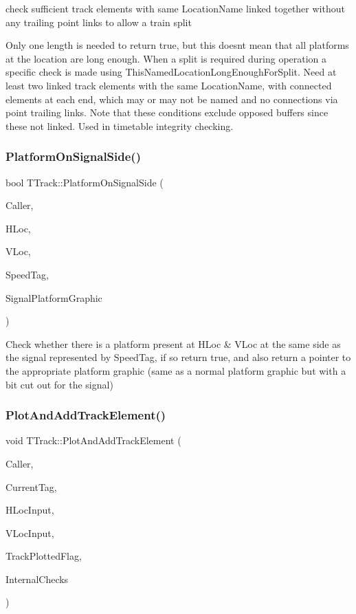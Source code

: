 check sufficient track elements with same Location\+Name linked together without any trailing point links to allow a train split

Only one length is needed to return true, but this doesn\textquotesingle{}t mean that all platforms at the location are long enough. When a split is required during operation a specific check is made using This\+Named\+Location\+Long\+Enough\+For\+Split. Need at least two linked track elements with the same Location\+Name, with connected elements at each end, which may or may not be named and no connections via point trailing links. Note that these conditions exclude opposed buffers since these not linked. Used in timetable integrity checking. \mbox{\label{class_t_track_a7c2888cb7acea2b9c65c5f9cc538df66}} 
\subsubsection{\texorpdfstring{Platform\+On\+Signal\+Side()}{PlatformOnSignalSide()}}
{\footnotesize\ttfamily bool T\+Track\+::\+Platform\+On\+Signal\+Side (\begin{DoxyParamCaption}\item[{int}]{Caller,  }\item[{int}]{H\+Loc,  }\item[{int}]{V\+Loc,  }\item[{int}]{Speed\+Tag,  }\item[{Graphics\+::\+T\+Bitmap $\ast$\&}]{Signal\+Platform\+Graphic }\end{DoxyParamCaption})}

Check whether there is a platform present at H\+Loc \& V\+Loc at the same side as the signal represented by Speed\+Tag, if so return true, and also return a pointer to the appropriate platform graphic (same as a normal platform graphic but with a bit cut out for the signal) \mbox{\label{class_t_track_a608674798cf48d88d614c8817566126e}} 
\subsubsection{\texorpdfstring{Plot\+And\+Add\+Track\+Element()}{PlotAndAddTrackElement()}}
{\footnotesize\ttfamily void T\+Track\+::\+Plot\+And\+Add\+Track\+Element (\begin{DoxyParamCaption}\item[{int}]{Caller,  }\item[{int}]{Current\+Tag,  }\item[{int}]{H\+Loc\+Input,  }\item[{int}]{V\+Loc\+Input,  }\item[{bool \&}]{Track\+Plotted\+Flag,  }\item[{bool}]{Internal\+Checks }\end{DoxyParamCaption})}

